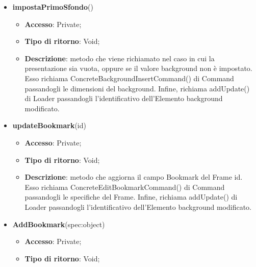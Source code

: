 {{\begin{itemize}
			\begin{itemize}
				\item \textbf{Accesso}: Public;
				\item \textbf{Tipo di ritorno}: Void;
				\item \textbf{Descrizione}: metodo che aggiorna il valore zIndex dell'Elemento correntemente selezionato attraverso la Funzione\ped{g} JavaScript mandaDietro(id\_Elemento) di Edit, e che richiama, utilizzando la Funzione execute di inv, concretePortaDietroCommand() di Command passandogli le specifiche con l'Elemento da aggiornare. Nel caso in cui il parametro spec sia definito, significa che è stata inviata una richiesta di undo/redo da Command, per cui, il metodo si occuperà solamente di aggiornare la view.
			\end{itemize}
			\item \textbf{impostaPrimoSfondo}()
			\begin{itemize}
				\item \textbf{Accesso}: Private;
				\item \textbf{Tipo di ritorno}: Void;
				\item \textbf{Descrizione}: metodo che viene richiamato nel caso in cui la presentazione sia vuota, oppure se il valore background non è impostato. Esso richiama ConcreteBackgroundInsertCommand() di Command passandogli le dimensioni del background. Infine, richiama addUpdate() di Loader passandogli l'identificativo dell'Elemento background modificato.
			\end{itemize}
			\item \textbf{updateBookmark}(id)
			\begin{itemize}
				\item \textbf{Accesso}: Private;
				\item \textbf{Tipo di ritorno}: Void;
				\item \textbf{Descrizione}: metodo che aggiorna il campo Bookmark\ped{g} del Frame id. Esso richiama ConcreteEditBookmarkCommand() di Command passandogli le specifiche del Frame. Infine, richiama addUpdate() di Loader passandogli l'identificativo dell'Elemento background modificato.
			\end{itemize}
			\item \textbf{AddBookmark}(spec:object)
			\begin{itemize}
				\item \textbf{Accesso}: Private;
				\item \textbf{Tipo di ritorno}: Void;

\end{itemize}
\end{itemize}}}
